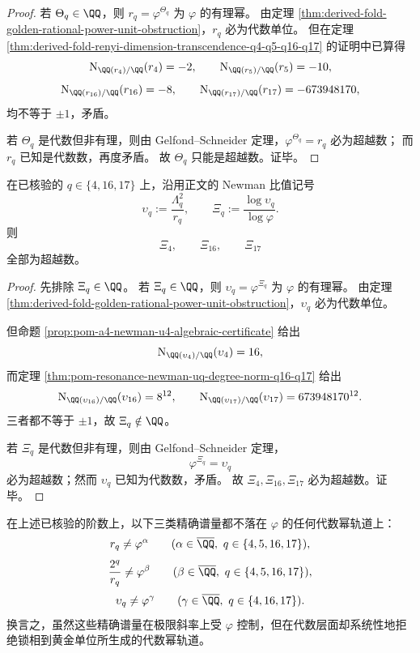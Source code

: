 \begin{proof}
若 \(\Theta_q\in\QQ\)，则 \(r_q=\varphi^{\Theta_q}\) 为 \(\varphi\) 的有理幂。
由定理 \ref{thm:derived-fold-golden-rational-power-unit-obstruction}，\(r_q\) 必为代数单位。
但在定理 \ref{thm:derived-fold-renyi-dimension-transcendence-q4-q5-q16-q17} 的证明中已算得
\[
\mathrm N_{\QQ(r_4)/\QQ}(r_4)=-2,\qquad
\mathrm N_{\QQ(r_5)/\QQ}(r_5)=-10,
\]
\[
\mathrm N_{\QQ(r_{16})/\QQ}(r_{16})=-8,\qquad
\mathrm N_{\QQ(r_{17})/\QQ}(r_{17})=-673948170,
\]
均不等于 \(\pm1\)，矛盾。

若 \(\Theta_q\) 是代数但非有理，则由 Gelfond--Schneider 定理，\(\varphi^{\Theta_q}=r_q\) 必为超越数；
而 \(r_q\) 已知是代数数，再度矛盾。
故 \(\Theta_q\) 只能是超越数。证毕。
\end{proof}

\begin{theorem}\label{thm:derived-fold-newman-golden-exponent-transcendence-q4-q16-q17}
在已核验的 \(q\in\{4,16,17\}\) 上，沿用正文的 Newman 比值记号
\[
\upsilon_q:=\frac{\Lambda_q^2}{r_q},
\qquad
\Xi_q:=\frac{\log \upsilon_q}{\log\varphi}.
\]
则
\[
\Xi_4,\qquad \Xi_{16},\qquad \Xi_{17}
\]
全部为超越数。
\end{theorem}

\begin{proof}
先排除 \(\Xi_q\in\QQ\)。
若 \(\Xi_q\in\QQ\)，则 \(\upsilon_q=\varphi^{\Xi_q}\) 为 \(\varphi\) 的有理幂。
由定理 \ref{thm:derived-fold-golden-rational-power-unit-obstruction}，\(\upsilon_q\) 必为代数单位。

但命题 \ref{prop:pom-a4-newman-u4-algebraic-certificate} 给出
\[
\mathrm N_{\QQ(\upsilon_4)/\QQ}(\upsilon_4)=16,
\]
而定理 \ref{thm:pom-resonance-newman-uq-degree-norm-q16-q17} 给出
\[
\mathrm N_{\QQ(\upsilon_{16})/\QQ}(\upsilon_{16})=8^{12},
\qquad
\mathrm N_{\QQ(\upsilon_{17})/\QQ}(\upsilon_{17})=673948170^{12}.
\]
三者都不等于 \(\pm1\)，故 \(\Xi_q\notin\QQ\)。

若 \(\Xi_q\) 是代数但非有理，则由 Gelfond--Schneider 定理，
\[
\varphi^{\Xi_q}=\upsilon_q
\]
必为超越数；然而 \(\upsilon_q\) 已知为代数数，矛盾。
故 \(\Xi_4,\Xi_{16},\Xi_{17}\) 必为超越数。证毕。
\end{proof}

\begin{corollary}[精确谱量与黄金幂轨道的代数失配]\label{cor:derived-fold-no-algebraic-golden-power-locking}
在上述已核验的阶数上，以下三类精确谱量都不落在 \(\varphi\) 的任何代数幂轨道上：
\[
r_q\neq \varphi^\alpha
\qquad
(\alpha\in\overline{\QQ},\ q\in\{4,5,16,17\}),
\]
\[
\frac{2^q}{r_q}\neq \varphi^\beta
\qquad
(\beta\in\overline{\QQ},\ q\in\{4,5,16,17\}),
\]
\[
\upsilon_q\neq \varphi^\gamma
\qquad
(\gamma\in\overline{\QQ},\ q\in\{4,16,17\}).
\]
换言之，虽然这些精确谱量在极限斜率上受 \(\varphi\) 控制，但在代数层面却系统性地拒绝锁相到黄金单位所生成的代数幂轨道。
\end{corollary}

